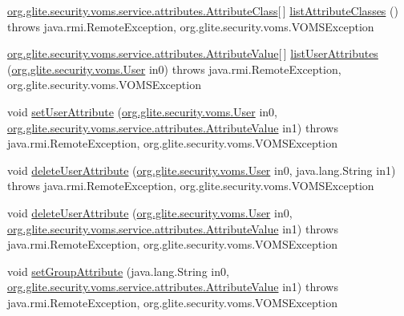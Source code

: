 \begin{DoxyCompactItemize}
\item 
\hyperlink{classorg_1_1glite_1_1security_1_1voms_1_1service_1_1attributes_1_1AttributeClass}{org.glite.security.voms.service.attributes.AttributeClass}\mbox{[}$\,$\mbox{]} \hyperlink{classorg_1_1glite_1_1security_1_1voms_1_1service_1_1attributes_1_1VOMSAttributesSoapBindingImpl_a1526875bc28a0ddd7825b489ac726ec5}{listAttributeClasses} ()  throws java.rmi.RemoteException, org.glite.security.voms.VOMSException 
\item 
\hyperlink{classorg_1_1glite_1_1security_1_1voms_1_1service_1_1attributes_1_1AttributeValue}{org.glite.security.voms.service.attributes.AttributeValue}\mbox{[}$\,$\mbox{]} \hyperlink{classorg_1_1glite_1_1security_1_1voms_1_1service_1_1attributes_1_1VOMSAttributesSoapBindingImpl_a16cb882de5b780ca09b5561b901c5bec}{listUserAttributes} (\hyperlink{classorg_1_1glite_1_1security_1_1voms_1_1User}{org.glite.security.voms.User} in0)  throws java.rmi.RemoteException, org.glite.security.voms.VOMSException 
\item 
void \hyperlink{classorg_1_1glite_1_1security_1_1voms_1_1service_1_1attributes_1_1VOMSAttributesSoapBindingImpl_abd46ad9091223c225ca1ff57ec2c6fb6}{setUserAttribute} (\hyperlink{classorg_1_1glite_1_1security_1_1voms_1_1User}{org.glite.security.voms.User} in0, \hyperlink{classorg_1_1glite_1_1security_1_1voms_1_1service_1_1attributes_1_1AttributeValue}{org.glite.security.voms.service.attributes.AttributeValue} in1)  throws java.rmi.RemoteException, org.glite.security.voms.VOMSException 
\item 
void \hyperlink{classorg_1_1glite_1_1security_1_1voms_1_1service_1_1attributes_1_1VOMSAttributesSoapBindingImpl_a3f5a947c66c7f86b56bde2cb1d5827b0}{deleteUserAttribute} (\hyperlink{classorg_1_1glite_1_1security_1_1voms_1_1User}{org.glite.security.voms.User} in0, java.lang.String in1)  throws java.rmi.RemoteException, org.glite.security.voms.VOMSException 
\item 
void \hyperlink{classorg_1_1glite_1_1security_1_1voms_1_1service_1_1attributes_1_1VOMSAttributesSoapBindingImpl_ac7fe2ce22582538594d8a4e8ad6801a2}{deleteUserAttribute} (\hyperlink{classorg_1_1glite_1_1security_1_1voms_1_1User}{org.glite.security.voms.User} in0, \hyperlink{classorg_1_1glite_1_1security_1_1voms_1_1service_1_1attributes_1_1AttributeValue}{org.glite.security.voms.service.attributes.AttributeValue} in1)  throws java.rmi.RemoteException, org.glite.security.voms.VOMSException 
\item 
void \hyperlink{classorg_1_1glite_1_1security_1_1voms_1_1service_1_1attributes_1_1VOMSAttributesSoapBindingImpl_a826e63ff83a5492d3e3c569734ce70d4}{setGroupAttribute} (java.lang.String in0, \hyperlink{classorg_1_1glite_1_1security_1_1voms_1_1service_1_1attributes_1_1AttributeValue}{org.glite.security.voms.service.attributes.AttributeValue} in1)  throws java.rmi.RemoteException, org.glite.security.voms.VOMSException 

\end{DoxyCompactItemize}
